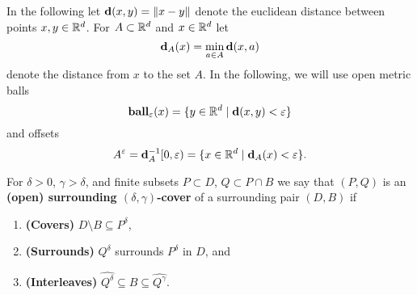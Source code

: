 
In the following let $\mathbf{d}(x, y) = \|x - y\|$ denote the euclidean distance between points $x,y\in \mathbb{R}^d$.
For $A\subset\mathbb{R}^d$ and $x\in \mathbb{R}^d$ let
\[\mathbf{d}_A(x) = \min_{a\in A}\mathbf{d}(x, a)\]
denote the distance from $x$ to the set $A$.
In the following, we will use open metric balls
\[\mathbf{ball}_\varepsilon(x) = \{y\in\mathbb{R}^d\mid \mathbf{d}(x, y) < \varepsilon\}\]
and offsets
\[A^\varepsilon = \mathbf{d}_A^{-1}[0, \varepsilon) = \{x\in \mathbb{R}^d\mid \mathbf{d}_A(x) < \varepsilon\}.\]
\begin{definition}
  For $\delta > 0$, $\gamma > \delta$, and finite subsets $P\subset D$, $Q\subset P\cap B$ we say that $(P, Q)$ is an \textbf{(open) surrounding $(\delta,\gamma)$-cover} of a surrounding pair $(D, B)$ if
  \begin{enumerate}[label=(\alph*)]
    \item\textbf{(Covers)} $D\setminus B \subseteq P^\delta$,
    \item\textbf{(Surrounds)} $Q^\delta$ surrounds $P^\delta$ in $D$, and
    \item\textbf{(Interleaves)} $\hat{Q^\delta}\subseteq B\subseteq \hat{Q^\gamma}$.
  \end{enumerate}
\end{definition}
